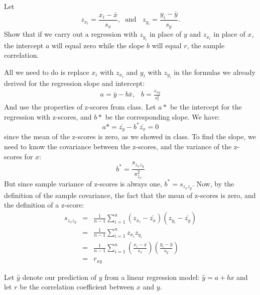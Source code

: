 \documentclass[addpoints,12pt]{exam}
\begin{document}
\begin{questions}
\question Let
    $$z_{x_i} = \frac{x_i - \bar{x}}{s_x}, \;\;\mbox{and }\;\; z_{y_i} = \frac{y_i - \bar{y}}{s_y}.$$
    Show that if we carry out a regression with $z_{y_i}$ in place of $y$ and $z_{x_i}$ in place of $x$, the intercept $a$ will equal zero while the slope $b$ will equal $r$, the sample correlation.
    \begin{solution}
     All we need to do is replace $x_i$ with $z_{x_i}$ and $y_i$ with $z_{y_i}$ in the formulas we already derived for the regression slope and intercept:
     		$$\begin{array}{lr}a = \bar{y} - b\bar{x}, & b = \displaystyle \frac{s_{xy}}{s_x^2}\end{array}$$
     		And use the properties of z-scores from class. Let $a*$ be the intercept for the regression with z-scores, and $b*$ be the corresponding slope. We have:
     	 	$$a* = \bar{z_y} - b^* \bar{z_x} = 0$$
     	 	since the mean of the z-scores is zero, as we showed in class. To find the slope, we need to know the covariance between the z-scores, and the variance of the z-scores for $x$:
     	 		$$b^* = \frac{s_{z_x z_y}}{s_{z_x}^2}$$
     	 		But since sample variance of z-scores is always one, $b^* = s_{z_x z_y}$. Now, by the definition of the sample covariance, the fact that the mean of z-scores is zero, and the definition of a z-score:
     	 		\begin{eqnarray*}
     	 		s_{z_x z_y} &=& \frac{1}{n-1} \sum_{i=1}^n (z_{x_i} - \bar{z_x})(z_{y_i} - \bar{z_y})\\
     	 		&=& \frac{1}{n-1} \sum_{i=1}^n z_{x_i}z_{y_i}\\
     	 		&=& \frac{1}{n-1} \sum_{i=1}^n \left(\frac{x_i - \bar{x}}{s_x}\right)\left(\frac{y_i - \bar{y}}{s_y}\right)\\
     	 		&=& r_{xy}
     	 		\end{eqnarray*}
    \end{solution}

\question Let $\hat{y}$ denote our prediction of $y$ from a linear regression model: $\hat{y} = a + b x$ and let $r$ be the correlation coefficient between $x$ and $y$.
\end{questions}
\end{document}
